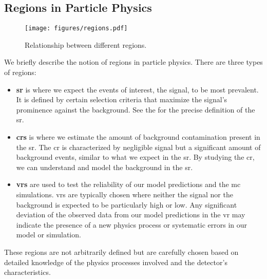 \subsection{Regions in Particle Physics}
\label{sec:regions}

\begin{figure}[htbp]
    \centering
    \texttt{[image: figures/regions.pdf]}
    \caption{Relationship between different regions.}
    \label{fig:regions}
\end{figure}

We briefly describe the notion of regions in particle physics. There are three types of regions:

\begin{itemize}
    \item \textbf{\gls{sr}} is where we expect the events of interest, the
          signal, to be most prevalent. It is defined by certain selection criteria that maximize the signal's prominence against
          the background. See the  for the precise definition of the \gls{sr}.

    \item \textbf{\glspl{cr}} is where we estimate the amount of background contamination
          present in the \gls{sr}. The \gls{cr} is characterized by negligible signal but a significant amount of background
          events, similar to what we expect in the \gls{sr}. By studying the \gls{cr}, we can understand and model the background in the \gls{sr}.

    \item \textbf{\glspl{vr}} are used to test the reliability of our model predictions and the \gls{mc} simulations.
          \glspl{vr} are typically chosen where neither the signal nor the background is expected to be particularly high or
          low. Any significant deviation of the observed data from our model predictions in the \gls{vr} may indicate the
          presence of a new physics process or systematic errors in our model or simulation.
\end{itemize}

These regions are not arbitrarily defined but are carefully chosen based on detailed knowledge of the physics processes
involved and the detector's characteristics.

